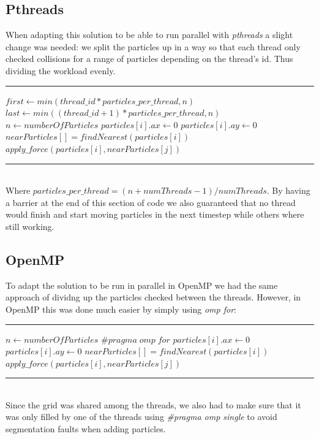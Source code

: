 \documentclass[11pt,a4paper]{article}
\begin{document}
\subsection{Pthreads}
When adapting this solution to be able to run parallel with \emph{pthreads} a slight change was needed: we split the particles up in a way so that each thread only checked collisions for a range of particles depending on the thread's id. Thus dividing the workload evenly.
\\
\rule{125mm}{0.1pt}
\begin{algorithmic}
\STATE $first \gets min(thread\_id * particles\_per\_thread,n)$
\STATE $last \gets min((thread\_id+1) * particles\_per\_thread,n)$
\STATE $n \gets numberOfParticles$
	\STATE $particles[i].ax \gets 0$
	\STATE $particles[i].ay \gets 0$
	\STATE $nearParticles[] = findNearest(particles[i])$
			\STATE $apply\_force(particles[i],nearParticles[j])$
	\ENDFOR
\ENDFOR 
\end{algorithmic}
\rule{125mm}{0.1pt}
\vspace{10pt}
\\
Where $particles\_per\_thread = (n+numThreads-1)/numThreads$. By having a barrier at the end of this section of code we also guaranteed that no thread would finish and start moving particles in the next timestep while others where still working.
\subsection{OpenMP}
To adapt the solution to be run in parallel in OpenMP we had the same approach of dividng up the particles checked between the threads. However, in OpenMP this was done much easier by simply using \emph{omp for}:
\\
\rule{125mm}{0.1pt}
\begin{algorithmic}
\STATE $n \gets numberOfParticles$
\STATE $\#pragma\;omp\;for$
	\STATE $particles[i].ax \gets 0$
	\STATE $particles[i].ay \gets 0$
	\STATE $nearParticles[] = findNearest(particles[i])$
			\STATE $apply\_force(particles[i],nearParticles[j])$
	\ENDFOR
\ENDFOR 
\end{algorithmic}
\rule{125mm}{0.1pt}
\vspace{10pt}
\\
Since the grid was shared among the threads, we also had to make sure that it was only filled by one of the threads using \emph{\#pragma omp single} to avoid segmentation faults when adding particles.
\end{document}
